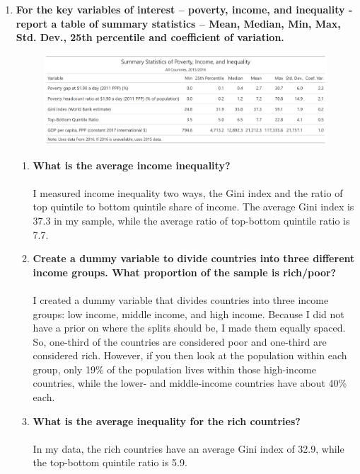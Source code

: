 \documentclass[12pt]{article}
\begin{document}
\begin{enumerate}
    \item \textbf{For the key variables of interest – poverty, income, and inequality - report a table of summary statistics – Mean, Median, Min, Max, Std. Dev., 25th percentile and coefficient of variation.}
    
    \begin{figure}[H]
        \centering
        \includegraphics[width=\textwidth]{./output/summary_stats_table.png}
    \end{figure}

    \begin{enumerate}
        \singlespace
        \item \textbf{What is the average income inequality?}
        \\\\
        I measured income inequality two ways, the Gini index and the ratio of top quintile to bottom quintile share of income. The average Gini index is 37.3 in my sample, while the average ratio of top-bottom quintile ratio is 7.7.

        \item \textbf{Create a dummy variable to divide countries into three different income groups. What proportion of the sample is rich/poor?}
        \\\\
        I created a dummy variable that divides countries into three income groups: low income, middle income, and high income. Because I did not have a prior on where the splits should be, I made them equally spaced. So, one-third of the countries are considered poor and one-third are considered rich. However, if you then look at the population within each group, only 19\% of the population lives within those high-income countries, while the lower- and middle-income countries have about 40\% each.

        \item \textbf{What is the average inequality for the rich countries?}
        \\\\
        In my data, the rich countries have an average Gini index of 32.9, while the top-bottom quintile ratio is 5.9.


\end{enumerate}
\end{enumerate}
\end{document}
